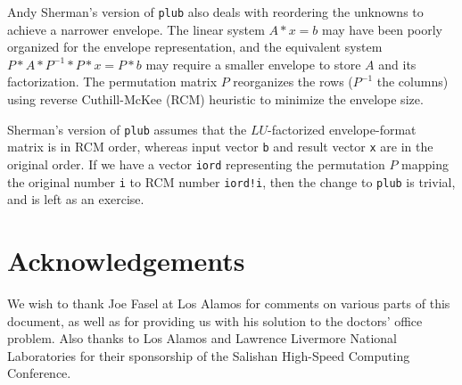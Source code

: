 Andy Sherman's version of {\tt plub} also deals with reordering
the unknowns to achieve a narrower envelope.
The linear system $A*x = b$ may have been poorly organized for the
envelope representation, and the equivalent system $ P*A*P^{-1}*P*x
= P*b $ may require a smaller envelope to store $A$ and its
factorization.  The permutation matrix $P$ reorganizes the rows
($P^{-1}$ the columns) using reverse Cuthill-McKee (RCM) 
heuristic to minimize the envelope size.

Sherman's version of {\tt plub}
assumes that the $LU$-factorized envelope-format matrix is in RCM order,
whereas input vector {\tt b} and result vector {\tt x} are in the original
order.  If we have a vector {\tt iord} representing the permutation $P$
mapping the original number {\tt i} to RCM number {\tt iord!i},
then the change to {\tt plub} is trivial, and is left as an exercise.

\section{Acknowledgements}

We wish to thank Joe Fasel at Los Alamos for comments on various parts
of this document, as well as for providing us with his solution to the
doctors' office problem.  Also thanks to Los Alamos and Lawrence
Livermore National Laboratories for their sponsorship of the Salishan
High-Speed Computing Conference.





